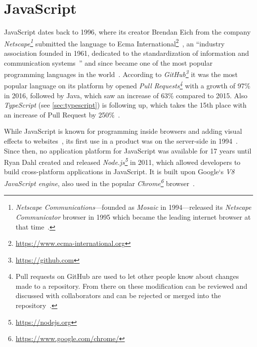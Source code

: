 %


\section{JavaScript}
\label{sec:javascript}

JavaScript dates back to 1996, where its creator Brendan Eich from the company \emph{Netscape\footnote{\emph{Netscape Communications}---founded as \emph{Mosaic} in 1994---released its \emph{Netscape Communicator} browser in 1995 which became the leading internet browser at that time~\cite{HistoryOfNetscape:Cooper:2014}.}} submitted the language to Ecma International\footnote{\url{https://www.ecma-international.org}}~\cite[p.~28]{ProJavaScriptDevelopment:Odell:2014}, an ``industry association founded in 1961, dedicated to the standardization of information and communication systems~\cite{EcmaInternational:Ecma}'' and since became one of the most popular programming languages in the world~\cite[p.~2]{JavaScriptTheGoodParts:Crockford:2008}. According to \emph{GitHub\footnote{\url{https://github.com}}} it was the most popular language on its platform by opened \emph{Pull Requests\footnote{Pull requests on GitHub are used to let other people know about changes made to a repository. From there on these modification can be reviewed and discussed with collaborators and can be rejected or merged into the repository~\cite{GitHubPullRequest:GitHub:2014}.}} with a growth of 97\% in 2016, followed by Java, which saw an increase of 63\% compared to 2015. Also \emph{TypeScript} (see \ref{sec:typescript}) is following up, which takes the 15th place with an increase of Pull Request by 250\%~\cite{GitHubOctoverse2016:GitHub:2016}.

While JavaScript is known for programming inside browsers and adding visual effects to websites~\cite[p.~4]{JavaScriptObjectProgramming:Rinehart:2015}, its first use in a product was on the server-side in 1994~\cite[p.~369]{ProJavaScriptDevelopment:Odell:2014}. Since then, no application platform for JavaScript was available for 17 years until Ryan Dahl created and released \emph{Node.js\footnote{\url{https://nodejs.org}}} in 2011, which allowed developers to build cross-platform applications in JavaScript. It is built upon Google`s \emph{V8 JavaScript engine}, also used in the popular \emph{Chrome\footnote{\url{https://www.google.com/chrome/}}} browser~\cite[p.~369]{ProJavaScriptDevelopment:Odell:2014}.

